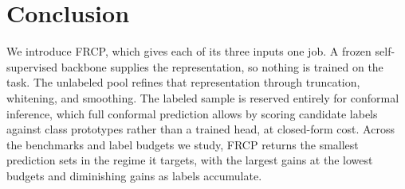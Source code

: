 
\section{Conclusion}
\label{sec:conclusion}

We introduce FRCP, which gives each of its three inputs one job. A
frozen self-supervised backbone supplies the representation, so nothing
is trained on the task. The unlabeled pool refines that representation
through truncation, whitening, and smoothing. The labeled sample is
reserved entirely for conformal inference, which full conformal
prediction allows by scoring candidate labels against class prototypes
rather than a trained head, at closed-form cost. Across the benchmarks
and label budgets we study, FRCP returns the smallest prediction sets in
the regime it targets, with the largest gains at the lowest budgets and
diminishing gains as labels accumulate.
